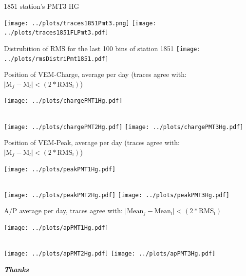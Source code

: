 \documentclass[aspectratio=169]{beamer}
\begin{document}
\begin{frame}
	1851 station's PMT3 HG

  \centering
	\texttt{[image: ../plots/traces1851Pmt3.png]}
	\texttt{[image: ../plots/traces1851FLPmt3.pdf]}
\end{frame}


\begin{frame}
	Distrubition of RMS for the last 100 bins of station 1851
	\centering
	\texttt{[image: ../plots/rmsDistriPmt1851.pdf]}
\end{frame}


\begin{frame}
	Position of VEM-Charge, average per day (traces agree with: $\mid \mathrm{M}_f - \mathrm{M}_l \mid < \left( 2*\mathrm{RMS_f} \right) $)

  \centering
	\texttt{[image: ../plots/chargePMT1Hg.pdf]}\quad%
	\begin{minipage}[b][0.4\textheight][c]
		{.45\linewidth}
	\end{minipage}\\[1em]
	\texttt{[image: ../plots/chargePMT2Hg.pdf]}\quad%
	\texttt{[image: ../plots/chargePMT3Hg.pdf]}
\end{frame}


\begin{frame}
	Position of VEM-Peak, average per day (traces agree with: $\mid \mathrm{M}_f - \mathrm{M}_l \mid < \left( 2*\mathrm{RMS_f} \right) $)

  \centering
	\texttt{[image: ../plots/peakPMT1Hg.pdf]}\quad%
	\begin{minipage}[b][0.4\textheight][c]
		{.45\linewidth}
	\end{minipage}\\[1em]
	\texttt{[image: ../plots/peakPMT2Hg.pdf]}\quad%
	\texttt{[image: ../plots/peakPMT3Hg.pdf]}
\end{frame}


\begin{frame}
	A/P average per day, traces agree with: $\mid \mathrm{Mean}_f - \mathrm{Mean}_l \mid < \left( 2*\mathrm{RMS_f} \right) $

  \centering
	\texttt{[image: ../plots/apPMT1Hg.pdf]}%
	\begin{minipage}[b][0.2\textheight][c]
		{.15\linewidth}
	\end{minipage}\\[1em]
	\texttt{[image: ../plots/apPMT2Hg.pdf]}\quad%
	\texttt{[image: ../plots/apPMT3Hg.pdf]}
\end{frame}


\begin{frame}
  \centering
	{\Huge\bf\it Thanks}
\end{frame}
\end{document}
